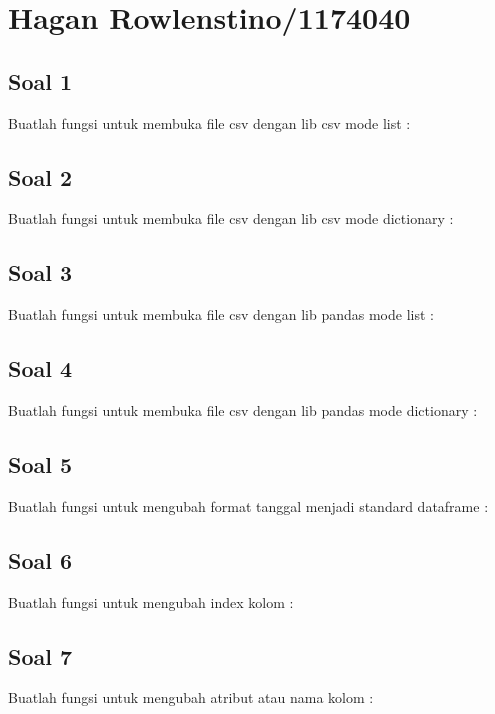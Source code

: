 \section{Hagan Rowlenstino/1174040}
\subsection{Soal 1}
Buatlah fungsi untuk membuka file csv dengan lib csv mode list : 


\subsection{Soal 2}
Buatlah fungsi untuk membuka file csv dengan lib csv mode dictionary : 


\subsection{Soal 3}
Buatlah fungsi  untuk membuka file csv dengan lib pandas mode list : 


\subsection{Soal 4}
Buatlah fungsi  untuk membuka file csv dengan lib pandas mode dictionary : 


\subsection{Soal 5}
Buatlah fungsi untuk mengubah format tanggal menjadi standard dataframe : 


\subsection{Soal 6}
Buatlah fungsi  untuk mengubah index kolom : 


\subsection{Soal 7}
Buatlah fungsi  untuk mengubah atribut atau nama kolom : 


